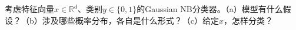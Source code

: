 考虑特征向量\(x\in\mathbb R^d\)、类别\(y\in\{0,1\}\)的Gaussian NB分类器。（a）模型有什么假设？（b）涉及哪些概率分布，各自是什么形式？（c）给定\(x\)，怎样分类？
